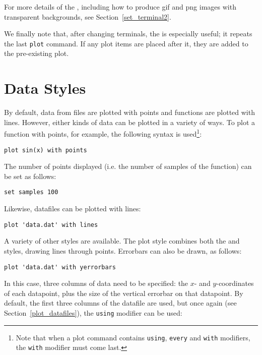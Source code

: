 For more details of the , including how to produce gif
and png images with transparent backgrounds, see Section~\ref{set_terminal2}.

We finally note that, after changing terminals, the  is
especially useful; it repeats the last {\tt plot} command. If any plot items
are placed after it, they are added to the pre-existing plot.

\section{Data Styles}

By default, data from files are plotted with points and functions are plotted
with lines. However, either kinds of data can be plotted in a variety of ways.
To plot a function with points, for example, the following syntax is
used\footnote{Note that when a plot command contains {\tt using}, {\tt every}
and {\tt with} modifiers, the {\tt with} modifier must come
last.}:

\begin{verbatim}
plot sin(x) with points
\end{verbatim}

\noindent The number of points displayed (i.e. the number of samples of the
function) can be set as follows:

\begin{verbatim}
set samples 100
\end{verbatim}

\noindent Likewise, datafiles can be plotted with lines:

\begin{verbatim}
plot 'data.dat' with lines
\end{verbatim}

A variety of other styles are available. The  plot style
combines both the  and  styles, drawing lines
through points.  Errorbars can also be drawn, as follows:

\begin{verbatim}
plot 'data.dat' with yerrorbars
\end{verbatim}

\noindent In this case, three columns of data need to be specified: the $x$-
and $y$-coordinates of each datapoint, plus the size of the vertical errorbar
on that datapoint. By default, the first three columns of the datafile are
used, but once again (see Section~\ref{plot_datafiles}), the {\tt using}
modifier can be used:

